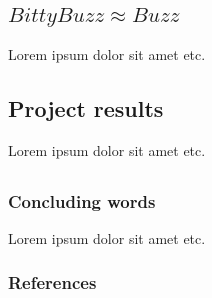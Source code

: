 \documentclass{beamer}
\begin{document}
	\begin{frame}
		\section{$BittyBuzz \approx Buzz$}
		Lorem ipsum dolor sit amet etc.
	\end{frame}
	\begin{frame}
		\section{Project results}
		Lorem ipsum dolor sit amet etc.
	\end{frame}
	\begin{frame}
		\section{}
		\frametitle{Concluding words}
		Lorem ipsum dolor sit amet etc.
	\end{frame}
	\begin{frame}
		\frametitle[allowframebreaks]{References}
		
	\end{frame}
\end{document}
